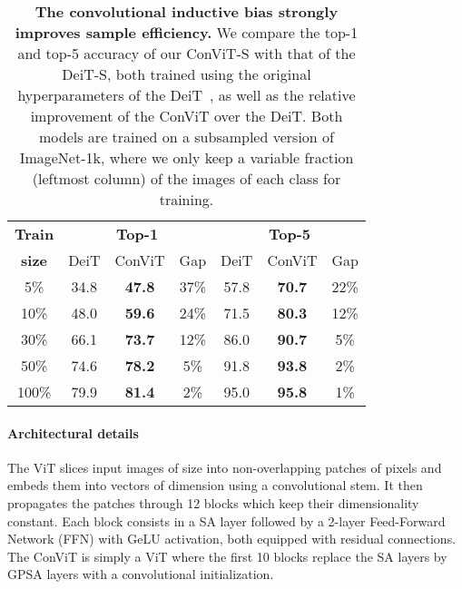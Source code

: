 \begin{table}[tb]
    \footnotesize
    \centering
    \begin{tabular}{c|c|c|c|c|c|c}
    \toprule
    \textbf{Train} & \multicolumn{3}{c|}{\textbf{Top-1}} & \multicolumn{3}{c}{\textbf{Top-5}}\\
    \textbf{size} & DeiT & ConViT & Gap & DeiT & ConViT & Gap\\
    \midrule
    5\% & 34.8 & \textbf{47.8} & 37\% & 57.8 & \textbf{70.7} & 22\%\\
    10\% & 48.0 & \textbf{59.6} & 24\% & 71.5 & \textbf{80.3} & 12\%\\
    30\% & 66.1 & \textbf{73.7} & 12\% & 86.0 & \textbf{90.7} & 5\%\\
    50\% & 74.6 & \textbf{78.2} & 5\% & 91.8 & \textbf{93.8} & 2\%\\
    100\%& 79.9 & \textbf{81.4} & 2\% & 95.0 & \textbf{95.8} & 1\%\\
\bottomrule
    \end{tabular}
    \caption{\textbf{The convolutional inductive bias strongly improves sample efficiency.} We compare the top-1 and top-5 accuracy of our ConViT-S with that of the DeiT-S, both trained using the original hyperparameters of the DeiT~\cite{touvron2020training}, as well as the relative improvement of the ConViT over the DeiT.  Both models are trained on a subsampled version of ImageNet-1k, where we only keep a variable fraction (leftmost column) of the images of each class for training.}
    \label{tab:sample-efficiency}
\end{table}





\paragraph{Architectural details}

The ViT slices input images of size  into  non-overlapping patches of  pixels and embeds them into vectors of dimension  using a convolutional stem. It then propagates the patches through 12 blocks which keep their dimensionality constant. Each block consists in a SA layer followed by a 2-layer Feed-Forward Network (FFN) with GeLU activation, both equipped with residual connections. The ConViT is simply a ViT where the first 10 blocks replace the SA layers by GPSA layers with a convolutional initialization.

